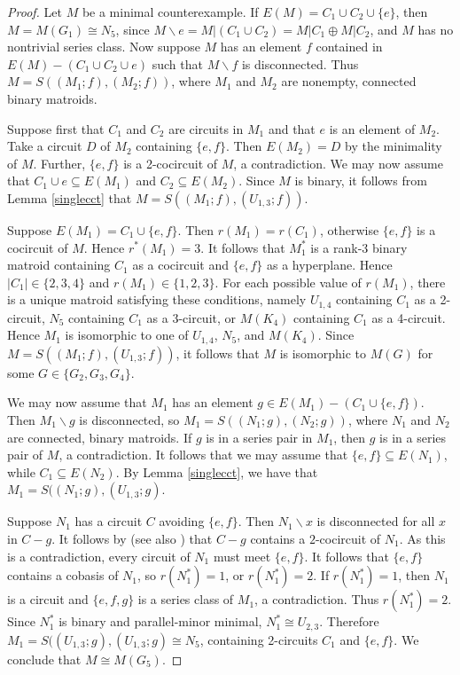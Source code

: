 \documentclass[12pt,reqno]{amsart}
\theoremstyle{definition}
\theoremstyle{remark}
\numberwithin{equation}{section}
\newcommand{\del}{\backslash}
\begin{document}
\begin{proof}
    Let $M$ be a minimal counterexample. 
    If $E(M)=C_1\cup C_2\cup \{e\}$, then $M=M(G_1)\cong N_5$, since $M\del e=M|(C_1\cup C_2)=M|C_1\oplus M|C_2$, and $M$ has no nontrivial series class. 
    Now suppose $M$ has an element $f$ contained in $E(M)-(C_1\cup C_2\cup e)$ such that $M\del f$ is disconnected. 
    Thus $M=S((M_1;f),(M_2;f))$, where $M_1$ and $M_2$ are nonempty, connected binary matroids.  
     
    Suppose first that $C_1$ and $C_2$ are circuits in $M_1$ and that $e$ is an element of $M_2$. Take a circuit $D$ of $M_2$ containing $\{e,f\}$. 
    Then $E(M_2)=D$ by the minimality of $M$. 
    Further, $\{e,f\}$ is a 2-cocircuit of $M$, a contradiction. 
    We may now assume that $C_1\cup e\subseteq E(M_1)$ and $C_2\subseteq E(M_2)$. 
    Since $M$ is binary, it follows from Lemma \ref{singlecct} that $M=S((M_1;f),(U_{1,3};f))$.
    
    Suppose $E(M_1)=C_1\cup \{e,f\}$. 
    Then $r(M_1)=r(C_1)$, otherwise $\{e,f\}$ is a cocircuit of $M$. 
    Hence $r^*(M_1)=3$. 
    It follows that $M_1^*$ is a rank-3 binary matroid containing $C_1$ as a cocircuit and $\{e,f\}$ as a hyperplane. 
    Hence $|C_1|\in \{2,3,4\}$ and $r(M_1)\in \{1,2,3\}$.  
    For each possible value of $r(M_1)$, there is a unique matroid satisfying these conditions, namely $U_{1,4}$ containing $C_1$ as a 2-circuit, $N_5$ containing $C_1$ as a 3-circuit, or $M(K_4)$ containing $C_1$ as a 4-circuit. 
    Hence $M_1$ is isomorphic to one of $U_{1,4}$, $N_5$, and $M(K_4)$. 
    Since $M=S((M_1;f),(U_{1,3};f))$, it follows that $M$ is isomorphic to $M(G)$ for some $G\in \{G_2,G_3,G_4\}$.  

    We may now assume that $M_1$ has an element $g\in E(M_1)-(C_1\cup \{e,f\})$. 
    Then $M_1\del g$ is disconnected, so $M_1=S((N_1;g),(N_2;g))$, where $N_1$ and $N_2$ are connected, binary matroids.  
    If $g$ is in a series pair in $M_1$, then $g$ is in a series pair of $M$, a contradiction. 
    It follows that we may assume that $\{e,f\}\subseteq E(N_1)$, while $C_1\subseteq E(N_2)$. 
    By Lemma \ref{singlecct}, we have that $M_1=S((N_1;g),(U_{1,3};g)$. 
    
    Suppose $N_1$ has a circuit $C$ avoiding $\{e,f\}$.
    Then $N_1\del x$ is disconnected for all $x$ in $C-g$.
    It follows by \cite[Lemma 2.3]{ox81} (see also \cite[Lemma~4.3.10]{ox}) that $C-g$ contains a $2$-cocircuit of $N_1$. 
    As this is a contradiction, every circuit of $N_1$ must meet $\{e,f\}$. 
    It follows that $\{e,f\}$ contains a cobasis of $N_1$, so $r(N_1^*)=1$, or $r(N_1^*)=2$. 
    If $r(N_1^*)=1$, then $N_1$ is a circuit and $\{e,f,g\}$ is a series class of $M_1$, a contradiction. 
    Thus $r(N_1^*)=2$. 
    Since $N_1^*$ is binary and parallel-minor minimal, $N_1^*\cong U_{2,3}$.  
    Therefore $M_1=S((U_{1,3};g),(U_{1,3};g)\cong N_5$, containing 2-circuits $C_1$ and $\{e,f\}$. 
    We conclude that $M\cong M(G_5)$.
\end{proof}
\end{document}
